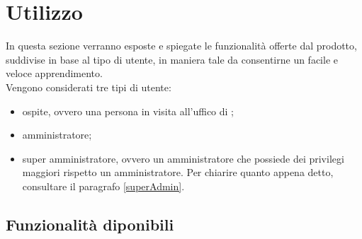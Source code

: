 \section{Utilizzo}
In questa sezione verranno esposte e spiegate le funzionalità offerte dal prodotto, suddivise in base al tipo di utente, in maniera tale da consentirne un facile e veloce apprendimento. \\
Vengono considerati tre tipi di utente:
\begin{itemize}
	\item ospite, ovvero una persona in visita all'uffico di \PROPONENTE;
	\item amministratore;
	\item super amministratore, ovvero un amministratore che possiede dei privilegi maggiori rispetto un amministratore. Per chiarire quanto appena detto, consultare il paragrafo \ref{superAdmin}.
\end{itemize}
 
\subsection{Funzionalità diponibili}\label{funz}
